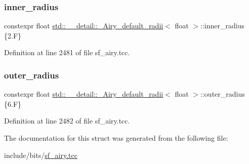 \subsubsection{\texorpdfstring{inner\+\_\+radius}{inner\_radius}}
{\footnotesize\ttfamily constexpr float \hyperlink{structstd_1_1____detail_1_1__Airy__default__radii}{std\+::\+\_\+\+\_\+detail\+::\+\_\+\+Airy\+\_\+default\+\_\+radii}$<$ float $>$\+::inner\+\_\+radius \{2.\+F\}\hspace{0.3cm}{\ttfamily [static]}}



Definition at line 2481 of file sf\+\_\+airy.\+tcc.

\mbox{\label{structstd_1_1____detail_1_1__Airy__default__radii_3_01float_01_4_ad8ea3a344f9748cf9bf32bcc17ca5d0b}} 
\subsubsection{\texorpdfstring{outer\+\_\+radius}{outer\_radius}}
{\footnotesize\ttfamily constexpr float \hyperlink{structstd_1_1____detail_1_1__Airy__default__radii}{std\+::\+\_\+\+\_\+detail\+::\+\_\+\+Airy\+\_\+default\+\_\+radii}$<$ float $>$\+::outer\+\_\+radius \{6.\+F\}\hspace{0.3cm}{\ttfamily [static]}}



Definition at line 2482 of file sf\+\_\+airy.\+tcc.



The documentation for this struct was generated from the following file\+:\begin{DoxyCompactItemize}
\item 
include/bits/\hyperlink{sf__airy_8tcc}{sf\+\_\+airy.\+tcc}\end{DoxyCompactItemize}
